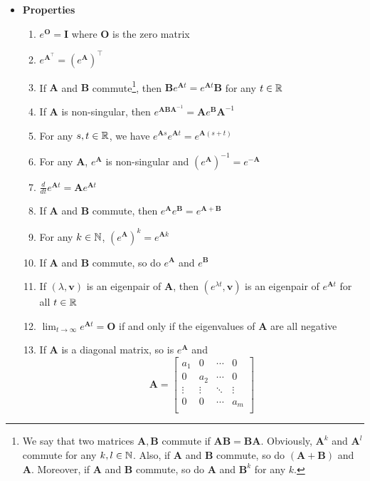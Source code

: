 \documentclass[12pt,a4paper]{article}
\begin{document}
\begin{itemize}
  \clearpage
\item \textbf{Properties}
  \begin{enumerate}
  \item $e^{\bm{O}} = \bm{I}$ where $\bm{O}$ is the zero matrix
  \item $e^{\bm{A}^{\top}} = \left(e^{\bm{A}}\right)^{\top}$
  \item If $\bm{A}$ and $\bm{B}$ commute\footnote{%
        We say that two matrices
        $\bm{A}, \bm{B}$ commute if $\bm{A}\bm{B} = \bm{B}\bm{A}$.
        Obviously, $\bm{A}^{k}$ and $\bm{A}^{l}$
        commute for any $k, l\in \mathbb{N}$.  Also, if $\bm{A}$ and $\bm{B}$ commute,
        so do $(\bm{A}+\bm{B})$ and $\bm{A}$.
        Moreover, if $\bm{A}$ and $\bm{B}$ commute, so do $\bm{A}$ and $\bm{B}^{k}$ for any $k$.
      },
      then $\bm{B}e^{\bm{A}t} = e^{\bm{A}t}\bm{B}$ for any $t\in\mathbb{R}$
    \item If $\bm{A}$ is non-singular, then $e^{\bm{A}\bm{B}\bm{A}^{-1}} = \bm{A}e^{\bm{B}}\bm{A}^{-1}$
    \item For any $s, t \in \mathbb{R}$, we have $e^{\bm{A}s}e^{\bm{A}t} = e^{\bm{A}(s+t)}$
    \item For any $\bm{A}$, $e^{\bm{A}}$ is non-singular and $(e^{\bm{A}})^{-1}=e^{-\bm{A}}$
    \item $\frac{d}{dt}e^{\bm{A}t} = \bm{A}e^{\bm{A}t}$
    \item If $\bm{A}$ and $\bm{B}$ commute, then $e^{\bm{A}}e^{\bm{B}} = e^{\bm{A}+\bm{B}}$
    \item For any $k\in \mathbb{N}$, $(e^{\bm{A}})^{k} = e^{\bm{A}k}$
    \item If $\bm{A}$ and $\bm{B}$ commute, so do $e^{\bm{A}}$ and $e^{\bm{B}}$
    \item If $(\lambda, \bm{v})$ is an eigenpair of $\bm{A}$, then
      $(e^{\lambda t}, \bm{v})$ is an eigenpair of $e^{\bm{A}t}$ for all $t\in \mathbb{R}$
    \item $\lim_{t\to\infty}e^{\bm{A}t}=\bm{O}$ if and only if the eigenvalues of $\bm{A}$ are all negative
    \item If $\bm{A}$ is a diagonal matrix, so is $e^{\bm{A}}$ and
      \begin{equation}\nonumber%
        \bm{A}
        =
        \begin{bmatrix}
          a_{1} & 0 & \cdots & 0 \\
          0 & a_{2} & \cdots & 0 \\
          \vdots & \vdots & \ddots & \vdots \\
          0 & 0 & \cdots & a_{m} \\

\end{bmatrix}
\end{equation}
\end{enumerate}
\end{itemize}
\end{document}
